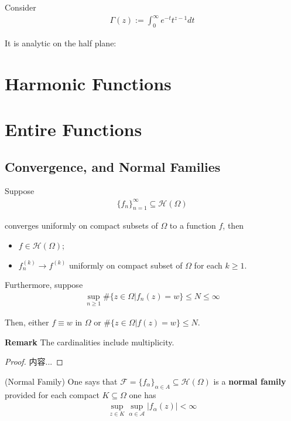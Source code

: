 \documentclass[Total.tex]{subfiles}
\begin{document}
			Consider
			\begin{gather*}
				\Gamma(z):=\int_0^\infty e^{-t}t^{z-1}dt
			\end{gather*}
			
			It is analytic on the half plane: 
	\chapter{Harmonic Functions}
	\chapter{Entire Functions}
		\section{Convergence, and Normal Families}
			\begin{lemma}
				Suppose
				\begin{gather*}
					\{f_n\}_{n=1}^\infty \subseteq \mathcal{H}(\Omega)
				\end{gather*}
				
				converges uniformly on compact subsets of $\Omega$ to a function $f$, then 
				\begin{itemize}
					\item $f\in \mathcal{H}(\Omega)$;
					\item $f_n^{(k)}\rightarrow f^{(k)}$ uniformly on compact subset of $\Omega$ for each $k\geq 1$. 
				\end{itemize}
				
				Furthermore, suppose 
				\begin{gather*}
					\sup_{n\geq 1}\#\{z\in \Omega|f_n(z)=w\}\leq N\leq \infty
				\end{gather*}
				
				Then, either $f\equiv w$ in $\Omega$ or $\#\{z\in \Omega|f(z)=w\}\leq N$.
				
				\textbf{Remark} The cardinalities include multiplicity.
			\end{lemma}
			\begin{proof}
				内容...
			\end{proof}
			
			\begin{Def}
				(Normal Family) One says that $\mathcal{F}=\{f_\alpha\}_{\alpha\in A}\subseteq \mathcal{H}(\Omega)$ is a \textbf{normal family} provided for each compact $K\subseteq \Omega$ one has
				\begin{gather*}
					\sup_{z\in K}\sup_{\alpha\in \mathcal{A}}|f_\alpha(z)|<\infty
				\end{gather*} 
			\end{Def}
			
\end{document}
